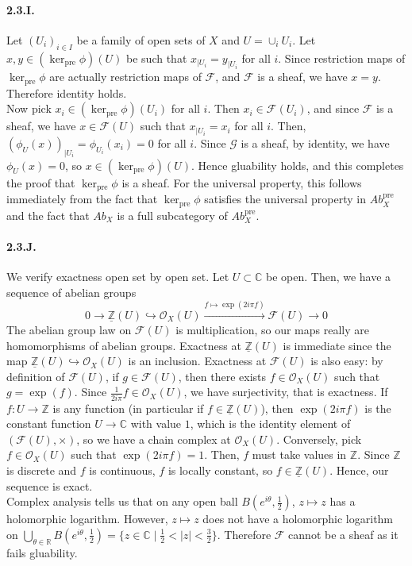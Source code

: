 \documentclass{article}
\newcommand{\pre}{\mathrm{pre}}
\newcommand{\Z}{\mathbb{Z}}
\newcommand{\R}{\mathbb{R}}
\newcommand{\C}{\mathbb{C}}
\newcommand{\Ab}{\mathit{Ab}}
\newcommand{\Osheaf}{\mathscr{O}}
\newcommand{\Fsheaf}{\mathscr{F}}
\newcommand{\Gsheaf}{\mathscr{G}}
\begin{document}
\paragraph{2.3.I.} Let $(U_i)_{i\in I}$ be a family of open sets of $X$ and $U = \cup_i U_i$. Let $x,y \in (\ker_\pre \phi) (U)$ be such that $x_{\mid U_i} = y_{\mid U_i}$ for all $i$. Since restriction maps of $\ker_\pre \phi$ are actually restriction maps of $\Fsheaf$, and $\Fsheaf$ is a sheaf, we have $x = y$. Therefore identity holds. \\
Now pick $x_i \in (\ker_\pre \phi)(U_i)$ for all $i$. Then $x_i \in \Fsheaf(U_i)$, and since $\Fsheaf$ is a sheaf, we have $x \in \Fsheaf(U)$ such that $x_{\mid U_i} = x_i$ for all $i$. Then, $(\phi_U (x))_{\mid U_i} = \phi_{U_i} (x_i) = 0$ for all $i$. Since $\Gsheaf$ is a sheaf, by identity, we have $\phi_U(x) = 0$, so $x \in (\ker_\pre \phi)(U)$. Hence gluability holds, and this completes the proof that $\ker_\pre \phi$ is a sheaf. For the universal property, this follows immediately from the fact that $\ker_\pre \phi$ satisfies the universal property in $\Ab_X^\pre$ and the fact that $\Ab_X$ is a full subcategory of $\Ab^\pre_X$.

\paragraph{2.3.J.} We verify exactness open set by open set. Let $U \subset \C$ be open. Then, we have a sequence of abelian groups
\[0 \to \underline{\Z}(U) \hookrightarrow \Osheaf_X (U) \xrightarrow{f \mapsto \exp(2i\pi f)} \Fsheaf(U) \to 0\]
The abelian group law on $\Fsheaf(U)$ is multiplication, so our maps really are homomorphisms of abelian groups. Exactness at $\underline{\Z}(U)$ is immediate since the map $\underline{\Z}(U) \hookrightarrow \Osheaf_X (U)$ is an inclusion. Exactness at $\Fsheaf(U)$ is also easy: by definition of $\Fsheaf(U)$, if $g \in \Fsheaf(U)$, then there exists $f \in \Osheaf_X(U)$ such that $g = \exp(f)$. Since $\frac{1}{2i\pi} f \in \Osheaf_X(U)$, we have surjectivity, that is exactness. If $f : U \to \Z$ is any function (in particular if $f \in \underline{\Z}(U)$), then $\exp(2i\pi f)$ is the constant function $U \to \C$ with value $1$, which is the identity element of $(\Fsheaf(U),\times)$, so we have a chain complex at $\Osheaf_X(U)$. Conversely, pick $f \in \Osheaf_X(U)$ such that $\exp(2i\pi f) = 1$. Then, $f$ must take values in $\Z$. Since $\Z$ is discrete and $f$ is continuous, $f$ is locally constant, so $f \in \underline{\Z}(U)$. Hence, our sequence is exact. \\
Complex analysis tells us that on any open ball $B(e^{i\theta}, \frac{1}{2})$, $z \mapsto z$ has a holomorphic logarithm. However, $z\mapsto z$ does not have a holomorphic logarithm on $\bigcup_{\theta \in \R} B(e^{i\theta}, \frac{1}{2}) = \{z \in \C \mid \frac{1}{2} < |z| < \frac{3}{2}\}$. Therefore $\Fsheaf$ cannot be a sheaf as it fails gluability.
\end{document}
